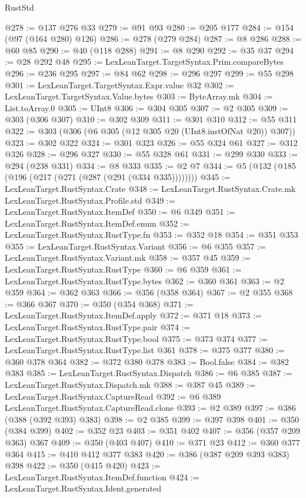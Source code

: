 \begin{lexlean}{RustStd}
\begin{coremodule}
@278 := @137 @276 @33
@279 := @91 @93
@280 := @205 @177
@284 := @154 (@97 (@164 @280) @126)
@286 := @278 (@279 @284)
@287 := @8 @286
@288 := @60 @85
@290 := @40 (@118 @288)
@291 := @8 @290
@292 := @35 @37
@294 := @28 @292 @48
@295 := LexLeanTarget.TargetSyntax.Prim.compareBytes
@296 := @236 @295
@297 := @84 @62
@298 := @296 @297
@299 := @55 @298
@301 := LexLeanTarget.TargetSyntax.Expr.value @32
@302 := LexLeanTarget.TargetSyntax.Value.bytes
@303 := ByteArray.mk
@304 := List.toArray.{0}
@305 := UInt8
@306 := @304 @305
@307 := @2 @305
@309 := @303 (@306 @307)
@310 := @302 @309
@311 := @301 @310
@312 := @55 @311
@322 := @303 (@306 (@6 @305 (@12 @305 @20 (UInt8.instOfNat @20)) @307))
@323 := @302 @322
@324 := @301 @323
@326 := @55 @324 @61
@327 := @312 @326
@328 := @296 @327
@330 := @55 @328 @61
@331 := @299 @330
@333 := @294 (@238 @331)
@334 := @8 @333
@335 := @2 @7
@344 := @5 (@132 (@185 (@196 (@217 (@271 (@287 (@291 (@334 @335))))))))
@345 := LexLeanTarget.RustSyntax.Crate
@348 := LexLeanTarget.RustSyntax.Crate.mk LexLeanTarget.RustSyntax.Profile.std
@349 := LexLeanTarget.RustSyntax.ItemDef
@350 := @6 @349
@351 := LexLeanTarget.RustSyntax.ItemDef.enum
@352 := LexLeanTarget.RustSyntax.RustType.fn
@353 := @352 @18
@354 := @351 @353
@355 := LexLeanTarget.RustSyntax.Variant
@356 := @6 @355
@357 := LexLeanTarget.RustSyntax.Variant.mk
@358 := @357 @45
@359 := LexLeanTarget.RustSyntax.RustType
@360 := @6 @359
@361 := LexLeanTarget.RustSyntax.RustType.bytes
@362 := @360 @361
@363 := @2 @359
@364 := @362 @363
@366 := @356 (@358 @364)
@367 := @2 @355
@368 := @366 @367
@370 := @350 (@354 @368)
@371 := LexLeanTarget.RustSyntax.ItemDef.apply
@372 := @371 @18
@373 := LexLeanTarget.RustSyntax.RustType.pair
@374 := LexLeanTarget.RustSyntax.RustType.bool
@375 := @373 @374
@377 := LexLeanTarget.RustSyntax.RustType.list @361
@378 := @375 @377
@380 := @360 @378 @364
@382 := @372 @380 @378
@383 := Bool.false
@384 := @382 @383
@385 := LexLeanTarget.RustSyntax.Dispatch
@386 := @6 @385
@387 := LexLeanTarget.RustSyntax.Dispatch.mk
@388 := @387 @45
@389 := LexLeanTarget.RustSyntax.CaptureRead
@392 := @6 @389 LexLeanTarget.RustSyntax.CaptureRead.clone
@393 := @2 @389
@397 := @386 (@388 (@392 @393) @383)
@398 := @2 @385
@399 := @397 @398
@401 := @350 (@384 @399)
@402 := @352 @23
@403 := @351 @402
@407 := @356 (@357 @209 @363) @367
@409 := @350 (@403 @407)
@410 := @371 @23
@412 := @360 @377 @364
@415 := @410 @412 @377 @383
@420 := @386 (@387 @209 @393 @383) @398
@422 := @350 (@415 @420)
@423 := LexLeanTarget.RustSyntax.ItemDef.function
@424 := LexLeanTarget.RustSyntax.Ident.generated

\end{coremodule}
\end{lexlean}

